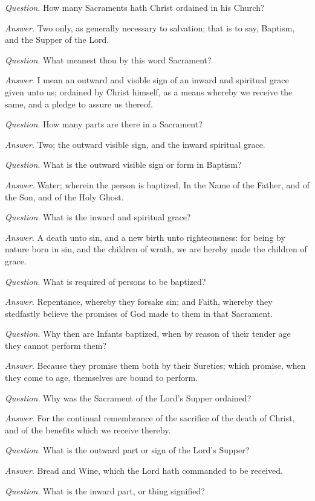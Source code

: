 \emph{Question}. How many Sacraments hath Christ
ordained in his Church?

\emph{Answer}. Two only, as generally necessary
to salvation; that is to say, Baptism, and the Supper of the Lord.

\emph{Question}. What meanest thou by this word
Sacrament?

\emph{Answer}. I mean an outward and visible
sign of an inward and spiritual grace given unto us; ordained by Christ
himself, as a means whereby we receive the same, and a pledge to assure
us thereof.

\emph{Question}. How many parts are there in
a Sacrament?

\emph{Answer}. Two; the outward visible sign,
and the inward spiritual grace.

\emph{Question}. What is the outward visible
sign or form in Baptism?

\emph{Answer}. Water; wherein the person is
baptized, In the Name of the Father, and of the Son, and of the Holy Ghost.

\emph{Question}. What is the inward and spiritual
grace?

\emph{Answer}. A death unto sin, and a new birth
unto righteousness: for being by nature born in sin, and the children
of wrath, we are hereby made the children of grace.

\emph{Question}. What is required of persons
to be baptized?

\emph{Answer}. Repentance, whereby they forsake
sin; and Faith, whereby they stedfastly believe the promises of God made
to them in that Sacrament.

\emph{Question}. Why then are Infants baptized,
when by reason of their tender age they cannot perform them?

\emph{Answer}. Because they promise them both
by their Sureties; which promise, when they come to age, themselves are
bound to perform.

\emph{Question}. Why was the Sacrament of the
Lord’s Supper ordained?

\emph{Answer}. For the continual remembrance
of the sacrifice of the death of Christ, and of the benefits which we
receive thereby.

\emph{Question}. What is the outward part or
sign of the Lord’s Supper?

\emph{Answer}. Bread and Wine, which the Lord
hath commanded to be received.

\emph{Question}. What is the inward part, or
thing signified?

